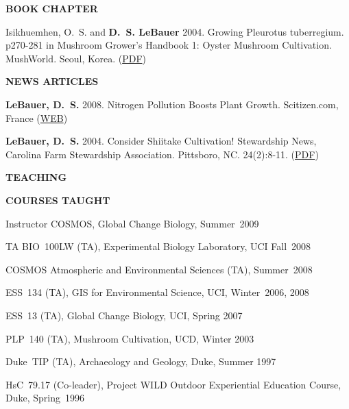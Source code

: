 \documentclass[10pt,twoside]{article}
\begin{document}
\textbf{BOOK CHAPTER}
\begin{itemize*}
\item \noindent 
Isikhuemhen, O.~S. and \textbf{D.~S. LeBauer} 2004. Growing Pleurotus tuberregium. p270-281 in Mushroom
Grower's Handbook 1: Oyster Mushroom Cultivation. MushWorld. Seoul, Korea.
\ifpdf %
(\href{https://netfiles.uiuc.edu/dlebauer/www/IsikhuemhenLeBauer2004GrowingPleurotustuberregium.pdf}{PDF}) 
\fi %
\end{itemize*}

\textbf{NEWS ARTICLES}
\begin{itemize*}
\item \noindent
\textbf{LeBauer, D.~S.} 2008. Nitrogen Pollution Boosts Plant Growth. Scitizen.com, France
\ifpdf %
(\href{http://scitizen.com/biodiversity/nitrogen-pollution-boost-plant-growth_a-22-1526.html}{WEB})
\fi %
\item \noindent%
 \textbf{LeBauer, D.~S.} 2004. Consider Shiitake Cultivation! Stewardship News, Carolina Farm Stewardship Association. Pittsboro, NC. 24(2):8-11.
\ifpdf %
(\href{https://netfiles.uiuc.edu/dlebauer/www/LeBauer_2004_Consider_Shiitake_Cultivation.pdf}{PDF}) 
\fi %

\end{itemize*}

\newpage

\textbf{TEACHING}

\hspace{0.5em} {\small \textbf{COURSES TAUGHT}}

\begin{itemize*}
\item{Instructor} COSMOS, Global Change Biology, Summer~2009
\item{TA} BIO~100LW (TA), Experimental Biology Laboratory, UCI Fall~2008
\item COSMOS  Atmospheric and Environmental Sciences (TA), Summer~2008
\item ESS~134 (TA), GIS for Environmental Science, UCI, Winter~2006, 2008
\item ESS~13 (TA), Global Change Biology, UCI, Spring 2007
\item PLP~140 (TA), Mushroom Cultivation, UCD, Winter 2003
\item Duke~TIP (TA), Archaeology and Geology, Duke, Summer 1997
\item HsC~79.17 (Co-leader), Project WILD Outdoor Experiential Education Course, Duke, Spring~1996
\end{itemize*}
\end{document}
